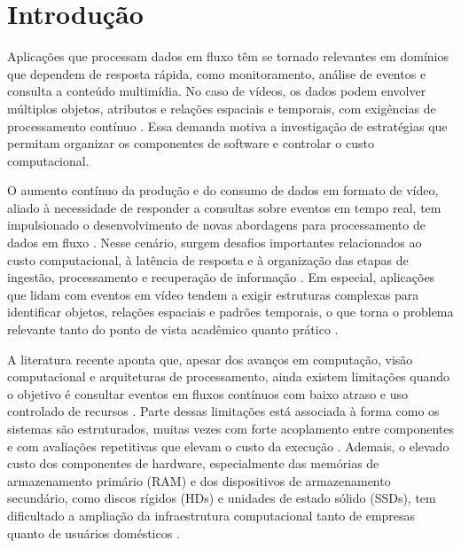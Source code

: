 
\chapter{Introdução}\label{cap:introducao}

Aplicações que processam dados em fluxo têm se tornado relevantes em domínios que dependem de resposta rápida, como monitoramento, análise de eventos e consulta a conteúdo multimídia. No caso de vídeos, os dados podem envolver múltiplos objetos, atributos e relações espaciais e temporais, com exigências de processamento contínuo \cite{kossoski2024applsci}. Essa demanda motiva a investigação de estratégias que permitam organizar os componentes de software e controlar o custo computacional.



O aumento contínuo da produção e do consumo de dados em formato de vídeo, aliado à necessidade de responder a consultas sobre eventos em tempo real, tem impulsionado o desenvolvimento de novas abordagens para processamento de dados em fluxo \cite{kossoski2025slr}. Nesse cenário, surgem desafios importantes relacionados ao custo computacional, à latência de resposta e à organização das etapas de ingestão, processamento e recuperação de informação \cite{kossoski2024applsci}. Em especial, aplicações que lidam com eventos em vídeo tendem a exigir estruturas complexas para identificar objetos, relações espaciais e padrões temporais, o que torna o problema relevante tanto do ponto de vista acadêmico quanto prático \cite{kossoski2024applsci}.

A literatura recente aponta que, apesar dos avanços em computação, visão computacional e arquiteturas de processamento, ainda existem limitações quando o objetivo é consultar eventos em fluxos contínuos com baixo atraso e uso controlado de recursos \cite{kossoski2024applsci}. Parte dessas limitações está associada à forma como os sistemas são estruturados, muitas vezes com forte acoplamento entre componentes e com avaliações repetitivas que elevam o custo da execução \cite{kossoski2024applsci}. 
Ademais, o elevado custo dos componentes de hardware, especialmente das memórias de armazenamento primário (RAM) e dos dispositivos de armazenamento secundário, como discos rígidos (HDs) e unidades de estado sólido (SSDs), tem dificultado a ampliação da infraestrutura computacional tanto de empresas quanto de usuários domésticos \cite{semensato2026ram}. 

